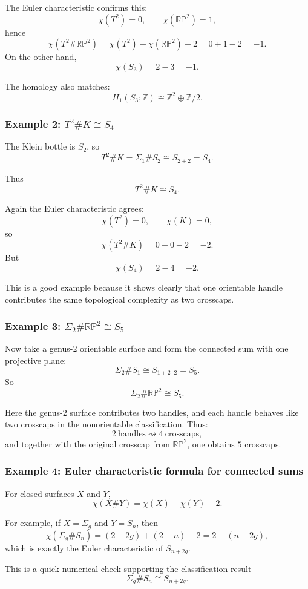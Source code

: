 \documentclass[12pt,a4paper]{article}
\newcommand{\Z}{\mathbb{Z}}
\newcommand{\RP}{\mathbb{RP}}
\theoremstyle{notespace}
\begin{document}
The Euler characteristic confirms this:
\[
\chi(T^2)=0,\qquad \chi(\RP^2)=1,
\]
hence
\[
\chi(T^2\#\RP^2)=\chi(T^2)+\chi(\RP^2)-2=0+1-2=-1.
\]
On the other hand,
\[
\chi(S_3)=2-3=-1.
\]

The homology also matches:
\[
H_1(S_3;\Z)\cong \Z^2\oplus \Z/2.
\]

\subsubsection*{Example 2: \(T^2 \# K \cong S_4\)}

The Klein bottle is \(S_2\), so
\[
T^2 \# K = \Sigma_1 \# S_2 \cong S_{2+2}=S_4.
\]

Thus
\[
T^2 \# K \cong S_4.
\]

Again the Euler characteristic agrees:
\[
\chi(T^2)=0,\qquad \chi(K)=0,
\]
so
\[
\chi(T^2\#K)=0+0-2=-2.
\]
But
\[
\chi(S_4)=2-4=-2.
\]

This is a good example because it shows clearly that one orientable handle contributes the same topological complexity as two crosscaps.

\subsubsection*{Example 3: \(\Sigma_2 \# \RP^2 \cong S_5\)}

Now take a genus-\(2\) orientable surface and form the connected sum with one projective plane:
\[
\Sigma_2 \# S_1 \cong S_{1+2\cdot 2}=S_5.
\]
So
\[
\Sigma_2 \# \RP^2 \cong S_5.
\]

Here the genus-\(2\) surface contributes two handles, and each handle behaves like two crosscaps in the nonorientable classification. Thus:
\[
2\ \text{handles} \rightsquigarrow 4\ \text{crosscaps},
\]
and together with the original crosscap from \(\RP^2\), one obtains \(5\) crosscaps.

\subsubsection*{Example 4: Euler characteristic formula for connected sums}

For closed surfaces \(X\) and \(Y\),
\[
\chi(X\#Y)=\chi(X)+\chi(Y)-2.
\]

For example, if \(X=\Sigma_g\) and \(Y=S_n\), then
\[
\chi(\Sigma_g\#S_n)=(2-2g)+(2-n)-2=2-(n+2g),
\]
which is exactly the Euler characteristic of \(S_{n+2g}\).

This is a quick numerical check supporting the classification result
\[
\Sigma_g\#S_n\cong S_{n+2g}.
\]
\end{document}
